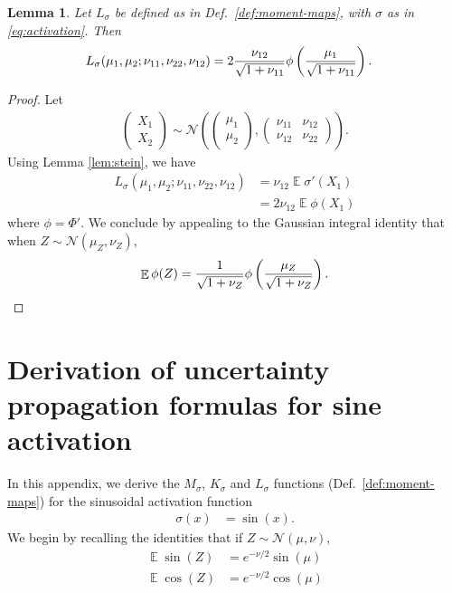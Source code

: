 \documentclass{article}
\newtheorem{lemma}{Lemma}
\DeclareMathOperator{\expect}{\mathbb{E}}
\begin{document}
\begin{lemma}
  Let \(L_\sigma\) be defined as in Def.~\ref{def:moment-maps}, with
  \(\sigma\) as in \eqref{eq:activation}.
  Then
  \begin{align*}
    L_\sigma(\mu_1, \mu_2; \nu_{11}, \nu_{22}, \nu_{12}) &= 2
    \frac{\nu_{12}}{\sqrt{1 + \nu_{11}}}
    \phi\del{\frac{\mu_1}{\sqrt{1 + \nu_{11}}}}.
  \end{align*}
\end{lemma}
\begin{proof}
   Let
  \begin{align}
  \begin{pmatrix} X_1 \\ X_2 \end{pmatrix}
   \sim \mathcal N\left(\begin{pmatrix}
    \mu_1
    \\
    \mu_2
  \end{pmatrix},
  \begin{pmatrix}
    \nu_{11}
    &
    \nu_{12}
    \\
    \nu_{12}
    &
    \nu_{22}
  \end{pmatrix}\right).
  \end{align}
  Using Lemma \ref{lem:stein}, we have
  \begin{align}
    L_\sigma(\mu_1, \mu_2; \nu_{11}, \nu_{22}, \nu_{12})
    &= \nu_{12} \expect \sigma'(X_1)
    \\
    &= 2\nu_{12} \expect \phi(X_1)
  \end{align}
  where \(\phi = \Phi'\).
  We conclude by appealing to the Gaussian integral identity that
  when \(Z \sim \mathcal N(\mu_Z, \nu_Z)\),
  \begin{align}
    \expect \phi(Z) = \frac{1}{\sqrt{1 + \nu_Z}}
    \phi\del{\frac{\mu_Z}{\sqrt{1 + \nu_Z}}}.
  \end{align}
\end{proof}

\section{Derivation of uncertainty propagation formulas for sine activation}
\label{app:sine}
In this appendix, we derive the \(M_\sigma\), \(K_\sigma\) and
\(L_\sigma\) functions (Def.~\ref{def:moment-maps}) for the sinusoidal activation function
\begin{align}
  \label{eq:activation-sin}
  \sigma(x) &= \sin(x).
\end{align}
We begin by recalling the identities that if \(Z \sim \mathcal N(\mu, \nu)\),
\begin{align}
\label{eq:expect-sin}
  \expect \sin(Z) &= e^{-\nu/2} \sin(\mu)
  \\
  \label{eq:expect-cos}
  \expect \cos(Z) &= e^{-\nu/2} \cos(\mu)
\end{align}
\end{document}
